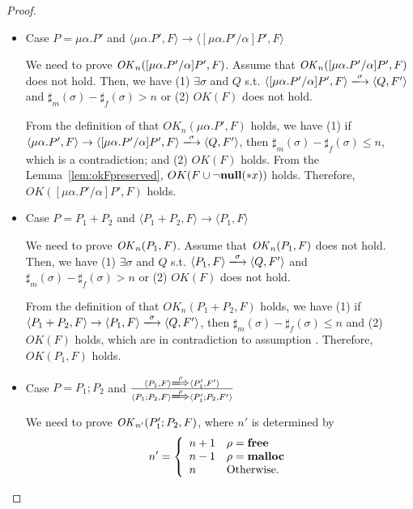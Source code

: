 \begin{proof}
\begin{itemize}
\item Case \( P = \mu\alpha.P' \) and \(  \langle \mu\alpha.P', F \rangle
  \rightarrow \langle [\mu\alpha.P'/\alpha]P', F  \rangle  \)

  We need to prove \(\mathit{OK}_n([\mu\alpha.P'/\alpha]P', F) \).  Assume
  that \(\mathit{OK}_n( [\mu\alpha.P'/\alpha]P', F) \) does not hold. Then, we
  have (1) \( \exists \sigma \) and \(Q\) s.t. \( \langle
  [\mu\alpha.P'/\alpha]P', F \rangle \xlongrightarrow{\sigma} \langle
  Q, F' \rangle \) and \(\sharp_{m}(\sigma) -
  \sharp_{f}(\sigma) > n\) or (2) \( OK(F)\) does not hold.

  From the definition of that \(OK_n(\mu\alpha.P', F)\) holds, we have
  (1) if \( \langle \mu\alpha.P', F \rangle \rightarrow \langle
  [\mu\alpha.P'/\alpha]P', F \rangle \xlongrightarrow{\sigma} \langle
  Q, F' \rangle \), then \(\sharp_m(\sigma) -
  \sharp_f(\sigma) \le n \), which is a contradiction; and (2)
  \(OK(F)\) holds. From the Lemma~\ref{lem:okFpreserved},
  \(OK(F\cup{\neg{\bf null}(*x)})\) holds. Therefore,
  \(OK([\mu\alpha.P'/\alpha]P', F) \) holds.


\item Case \( P = P_1 + P_2 \) and \(  \langle P_1 + P_2, F \rangle
  \rightarrow \langle P_1, F  \rangle  \)

  We need to prove \(\mathit{OK}_n(P_1, F) \).  Assume that \(\mathit{OK}_n(P_1, F) \)
  does not hold. Then, we have (1) \( \exists \sigma \) and \(Q\)
  s.t. \( \langle P_1, F \rangle \xlongrightarrow{\sigma} \langle Q,
  F' \rangle \) and \(\sharp_{m}(\sigma) -
  \sharp_{f}(\sigma) > n\) or (2) \( OK(F)\) does not hold.

  From the definition of that \(OK_n(P_1 + P_2, F)\) holds, we have
  (1) if \( \langle P_1 + P_2, F \rangle \rightarrow \langle P_1, F
  \rangle \xlongrightarrow{\sigma} \langle Q, F' \rangle \), then \(\sharp_m(\sigma) - \sharp_f(\sigma) \le n \) and
  (2) \(OK(F)\) holds, which are in contradiction to assumption
  . Therefore, \(OK(P_1, F) \) holds.

\item Case \( P = P_1;P_2 \) and \( \frac{ \langle P_1, F \rangle
  \xLongrightarrow{\rho} \langle P_1', F' \rangle} { \langle P_1;P_2,
  F \rangle \xLongrightarrow{\rho} \langle P_1';P_2, F' \rangle } \)

  We need to prove \(\mathit{OK}_{n'}(P_1';P_2, F) \), where \(n'\) is
  determined by 
  \[
   n'=\left\{
   \begin{array}{ll}
     n + 1 & \rho = \mathbf{free}\\
     n - 1 & \rho = \mathbf{malloc}\\
     n & \mbox{Otherwise.}
   \end{array}
   \right.
   \]


\end{itemize}
\end{proof}
